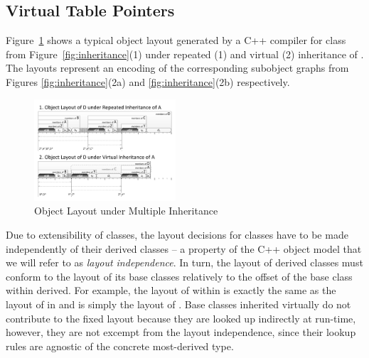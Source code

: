 \subsection{Virtual Table Pointers}
\label{sec:vtp}


Figure~\ref{fig:objlayout} shows a typical object layout generated by a C++ 
compiler for class  from Figure~\ref{fig:inheritance}(1) under repeated 
(1) and virtual (2) inheritance of . The layouts represent an encoding 
of the corresponding subobject graphs from Figures \ref{fig:inheritance}(2a) and 
\ref{fig:inheritance}(2b) respectively.

\begin{figure}[htbp]
  \centering
    \includegraphics[width=0.47\textwidth]{obj-layout.pdf}
  \caption{Object Layout under Multiple Inheritance}
  \label{fig:objlayout}
\end{figure}

Due to extensibility of classes, the layout decisions for classes have to be 
made independently of their derived classes -- a property of the C++ object 
model that we will refer to as \emph{layout independence}. In turn, the layout of derived   
classes must conform to the layout of its base classes relatively to the offset 
of the base class within derived. For example, the layout of  within 
 is exactly the same as the layout of  in  and is simply 
the layout of . Base classes inherited virtually do not contribute to 
the fixed layout because they are looked up indirectly at run-time, however, 
they are not excempt from the layout independence, since their lookup rules are 
agnostic of the concrete most-derived type.

